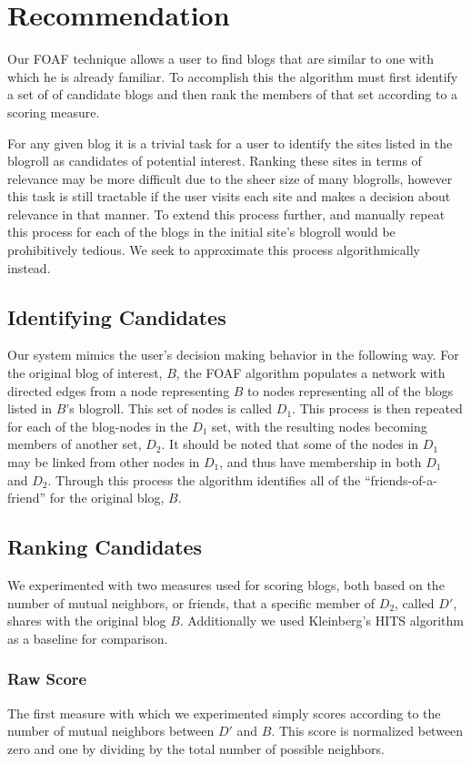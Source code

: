 \documentclass{sig-alternate-nocopyright}
\begin{document}
\section{Recommendation}
Our FOAF technique allows a user to find blogs that are similar to one
with which he is already familiar.  To accomplish this the algorithm
must first identify a set of of candidate blogs and then rank the
members of that set according to a scoring measure.

For any given blog it is a trivial task for a user to identify the sites
listed in the blogroll as candidates of potential interest.  Ranking
these sites in terms of relevance may be more difficult due to the
sheer size of many blogrolls, however this task is still tractable if
the user visits each site and makes a decision about relevance in that
manner.  To extend this process further, and manually repeat this process for 
each of the blogs in the initial site's blogroll would be prohibitively tedious.  We seek to approximate this process
algorithmically instead.

\subsection{Identifying Candidates}
Our system mimics the user's decision making behavior in the following
way.  For the original blog of interest, $B$, the FOAF algorithm
populates a network with directed edges from a node representing $B$ to
nodes representing all of the blogs listed in $B$'s blogroll.  This set
of nodes is called $D_1$.  This process is then repeated for each of the
blog-nodes in the $D_1$ set, with the resulting nodes becoming members
of another set, $D_2$.  It should be noted that some of the nodes in $D_1$
may be linked from other nodes in $D_1$, and thus have membership in
both $D_1$ and $D_2$.  Through this process the algorithm identifies all of
the ``friends-of-a-friend'' for the original blog, $B$.

\subsection{Ranking Candidates}
We experimented with two measures used for scoring blogs, both based
on the number of mutual neighbors, or friends, that a specific member
of $D_2$, called $D'$, shares with the original blog $B$.  Additionally we 
used Kleinberg's HITS algorithm as a baseline for comparison.

\subsubsection{Raw Score}
The first  measure with which we experimented  simply scores according
to the  number of mutual  neighbors between $D'$  and $B$.  This  score is
normalized between zero and one by dividing by the total number
of possible neighbors.
\end{document}
